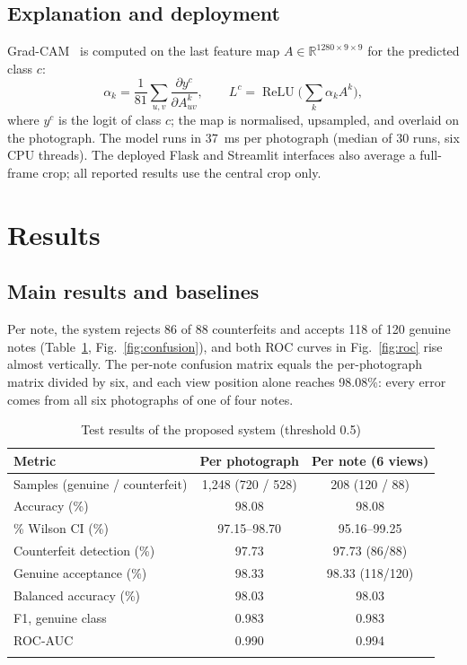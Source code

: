 \documentclass[pdflatex,iicol,sn-mathphys-num]{sn-jnl}
\begin{document}
\subsection{Explanation and deployment}\label{sec:deploy}

Grad-CAM~\cite{selvaraju2017gradcam} is computed on the last feature map
$A\in\mathbb{R}^{1280\times9\times9}$ for the predicted class $c$:
\begin{equation}
\alpha_k = \frac{1}{81}\sum_{u,v}\frac{\partial y^{c}}{\partial A^{k}_{uv}},\qquad
L^{c} = \operatorname{ReLU}\!\Big(\sum_{k}\alpha_k A^{k}\Big),
\label{eq:gradcam}
\end{equation}
where $y^c$ is the logit of class $c$; the map is normalised, upsampled, and overlaid on
the photograph. The model runs in 37~ms per photograph (median of 30 runs, six CPU
threads). The deployed Flask and Streamlit interfaces also average a full-frame crop;
all reported results use the central crop only.

\section{Results}\label{sec:results}

\subsection{Main results and baselines}\label{sec:main}

Per note, the system rejects 86 of 88 counterfeits and accepts 118 of 120 genuine notes
(Table~\ref{tab:main}, Fig.~\ref{fig:confusion}), and both ROC curves in
Fig.~\ref{fig:roc} rise almost vertically. The per-note confusion matrix equals the
per-photograph matrix divided by six, and each view position alone reaches 98.08\%:
every error comes from all six photographs of one of four notes.

\begin{table}[!t]
\caption{Test results of the proposed system (threshold 0.5)}\label{tab:main}
\begin{tabular*}{\textwidth}{@{\extracolsep\fill}lcc}
\toprule
Metric & Per photograph & Per note (6 views) \\
\midrule
Samples (genuine / counterfeit) & 1{,}248 (720 / 528) & 208 (120 / 88) \\
Accuracy (\%) & 98.08 & 98.08 \\
\quad 95\% Wilson CI (\%) & 97.15--98.70 & 95.16--99.25 \\
Counterfeit detection (\%) & 97.73 & 97.73 (86/88) \\
Genuine acceptance (\%) & 98.33 & 98.33 (118/120) \\
Balanced accuracy (\%) & 98.03 & 98.03 \\
F1, genuine class & 0.983 & 0.983 \\
ROC-AUC & 0.990 & 0.994 \\
\botrule
\end{tabular*}
\end{table}
\end{document}

